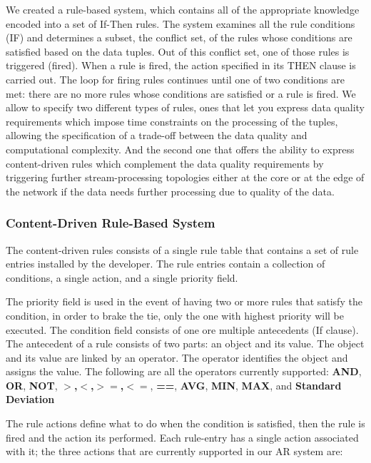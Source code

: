 We created a rule-based system, which contains all of the appropriate knowledge encoded into a set of If-Then rules. The system examines all the rule conditions (IF) and determines a subset, the conflict set, of the rules whose conditions are satisfied based on the data tuples. Out of this conflict set, one of those rules is triggered (fired). When a rule is fired, the action specified in its THEN clause is carried out. The loop for firing rules continues until one of two conditions are met: there are no more rules whose conditions are satisfied or a rule is fired. We allow to specify two different types of rules, ones that let you express data quality requirements which impose time constraints on the processing of the tuples, allowing the specification of a trade-off between the data quality and computational complexity. And the second one that offers the ability to express content-driven rules which complement the data quality requirements by triggering further stream-processing topologies either at the core or at the edge of the network if the data needs further processing due to quality of the data.

\subsubsection{Content-Driven Rule-Based System}
The content-driven rules consists of a single rule table that contains a set of rule entries installed by the developer. The rule entries contain a collection of conditions, a single action, and a single priority field.

The priority field is used in the event of having two or more rules that satisfy the condition, in order to brake the tie, only the one with highest priority will be executed. The condition field consists of one ore multiple antecedents (If clause). The antecedent of a rule consists of two parts: an object and its value. The object and its value are linked by an operator. The operator identifies the object and assigns the value. The following are all the operators currently supported:
\textbf{AND}, \textbf{OR}, \textbf{NOT}, \textbf{$>$,$<$,$>=$,$<=$}, \textbf{==}, \textbf{AVG}, \textbf{MIN}, \textbf{MAX}, and \textbf{Standard Deviation}

The rule actions define what to do when the condition is satisfied, then the rule is fired and the action its performed. Each rule-entry has a single action associated with it; the three actions that are currently supported in our AR system are:

